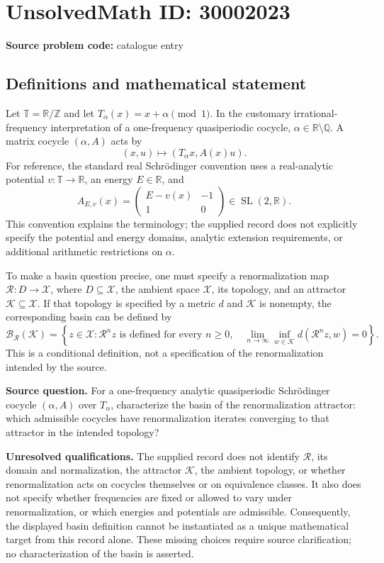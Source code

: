 \documentclass[11pt]{article}
\newcommand{\Z}{\mathbb{Z}}
\newcommand{\Q}{\mathbb{Q}}
\newcommand{\R}{\mathbb{R}}
\begin{document}
\section*{UnsolvedMath ID: 30002023}
\textbf{Source problem code:} catalogue entry
\subsection{Definitions and mathematical statement}
Let \(\mathbb T=\R/\Z\) and let \(T_\alpha(x)=x+\alpha\pmod 1\). In the customary irrational-frequency interpretation of a one-frequency quasiperiodic cocycle, \(\alpha\in\R\setminus\Q\). A matrix cocycle \((\alpha,A)\) acts by
\[
(x,u)\longmapsto (T_\alpha x,A(x)u).
\]
For reference, the standard real Schr\"odinger convention uses a real-analytic potential \(v:\mathbb T\to\R\), an energy \(E\in\R\), and
\[
A_{E,v}(x)=\begin{pmatrix}E-v(x)&-1\\1&0\end{pmatrix}\in\operatorname{SL}(2,\R).
\]
This convention explains the terminology; the supplied record does not explicitly specify the potential and energy domains, analytic extension requirements, or additional arithmetic restrictions on \(\alpha\).

To make a basin question precise, one must specify a renormalization map \(\mathcal R:D\to\mathcal X\), where \(D\subseteq\mathcal X\), the ambient space \(\mathcal X\), its topology, and an attractor \(\mathcal K\subseteq\mathcal X\). If that topology is specified by a metric \(d\) and \(\mathcal K\) is nonempty, the corresponding basin can be defined by
\[
\mathcal B_{\mathcal R}(\mathcal K)
=\left\{z\in\mathcal X:
\mathcal R^n z\text{ is defined for every }n\geq0,
\quad\lim_{n\to\infty}\inf_{w\in\mathcal K}d(\mathcal R^n z,w)=0
\right\}.
\]
This is a conditional definition, not a specification of the renormalization intended by the source.

\textbf{Source question.} For a one-frequency analytic quasiperiodic Schr\"odinger cocycle \((\alpha,A)\) over \(T_\alpha\), characterize the basin of the renormalization attractor: which admissible cocycles have renormalization iterates converging to that attractor in the intended topology?

\textbf{Unresolved qualifications.} The supplied record does not identify \(\mathcal R\), its domain and normalization, the attractor \(\mathcal K\), the ambient topology, or whether renormalization acts on cocycles themselves or on equivalence classes. It also does not specify whether frequencies are fixed or allowed to vary under renormalization, or which energies and potentials are admissible. Consequently, the displayed basin definition cannot be instantiated as a unique mathematical target from this record alone. These missing choices require source clarification; no characterization of the basin is asserted.
\end{document}
